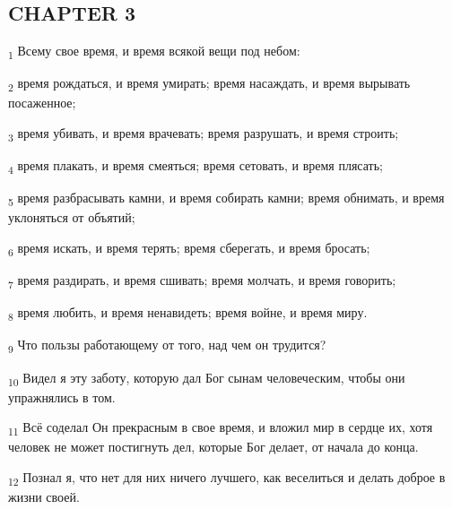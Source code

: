 \subsection{CHAPTER 3}
\begin{tcolorbox}
\textsubscript{1} Всему свое время, и время всякой вещи под небом:
\end{tcolorbox}
\begin{tcolorbox}
\textsubscript{2} время рождаться, и время умирать; время насаждать, и время вырывать посаженное;
\end{tcolorbox}
\begin{tcolorbox}
\textsubscript{3} время убивать, и время врачевать; время разрушать, и время строить;
\end{tcolorbox}
\begin{tcolorbox}
\textsubscript{4} время плакать, и время смеяться; время сетовать, и время плясать;
\end{tcolorbox}
\begin{tcolorbox}
\textsubscript{5} время разбрасывать камни, и время собирать камни; время обнимать, и время уклоняться от объятий;
\end{tcolorbox}
\begin{tcolorbox}
\textsubscript{6} время искать, и время терять; время сберегать, и время бросать;
\end{tcolorbox}
\begin{tcolorbox}
\textsubscript{7} время раздирать, и время сшивать; время молчать, и время говорить;
\end{tcolorbox}
\begin{tcolorbox}
\textsubscript{8} время любить, и время ненавидеть; время войне, и время миру.
\end{tcolorbox}
\begin{tcolorbox}
\textsubscript{9} Что пользы работающему от того, над чем он трудится?
\end{tcolorbox}
\begin{tcolorbox}
\textsubscript{10} Видел я эту заботу, которую дал Бог сынам человеческим, чтобы они упражнялись в том.
\end{tcolorbox}
\begin{tcolorbox}
\textsubscript{11} Всё соделал Он прекрасным в свое время, и вложил мир в сердце их, хотя человек не может постигнуть дел, которые Бог делает, от начала до конца.
\end{tcolorbox}
\begin{tcolorbox}
\textsubscript{12} Познал я, что нет для них ничего лучшего, как веселиться и делать доброе в жизни своей.
\end{tcolorbox}
